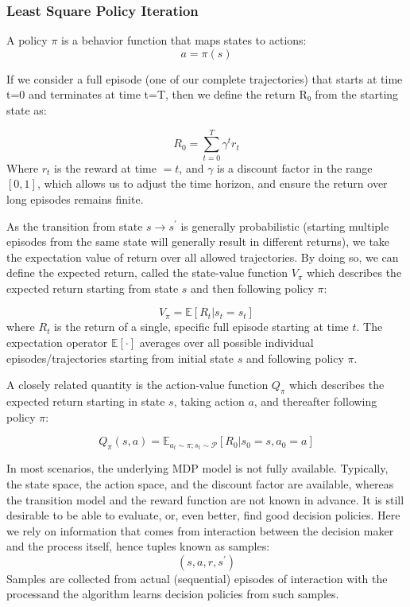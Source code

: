 \documentclass[9pt]{beamer} %
\begin{document}
\begin{frame}
\frametitle{Least Square Policy Iteration}
A policy $\pi$ is a behavior function that maps states to actions:
\begin{equation}
a = \pi(s)
\end{equation}

If we consider a full episode (one of our complete trajectories) that starts at time t=0 and terminates at time t=T, then we define the return R₀ from the starting state as:

\begin{equation}
R_0 = \sum_{t=0}^T \gamma^t r_t
\end{equation}
Where $r_t$ is the reward at time $=t$, and $\gamma$ is a discount factor in the range $[0,1]$, which allows us to adjust the time horizon, and ensure the return over long episodes remains finite. 

As the transition from state $s \rightarrow s^{\prime}$ is generally probabilistic (starting multiple episodes from the same state will generally result in different returns), we take the expectation value of return over all allowed trajectories. By doing so, we can define the expected return, called the state-value function $V_{\pi}$ which describes the expected return starting from state $s$ and then following policy $\pi$:

\begin{equation}
V_{\pi} =  \mathbb{E}[R_t | s_t = s_t] 
\end{equation}
where $R_t$ is the return of a single, specific full episode starting at time $t$. The expectation operator $\mathbb{E}[\cdot]$ averages over all possible individual episodes/trajectories starting from initial state $s$ and following policy $\pi$. 

A closely related quantity is the action-value function $Q_{\pi}$ which describes the expected return starting in state $s$, taking action $a$, and thereafter following policy $\pi$:

\begin{equation}
Q_{\pi}(s,a) =  \mathbb{E}_{a_t \sim \pi; s_t \sim \mathcal{P}}[R_0 | s_0 = s, a_0 = a] 
\end{equation}

In most scenarios, the underlying MDP model is not fully available. Typically, the state space, the action space, and the discount factor are available, whereas the transition model and the reward function are not known in advance. It is still desirable to be able to evaluate, or, even better, find good decision policies. Here we rely on information that comes from interaction between the decision maker and the process itself, hence tuples known as samples: 
\begin{equation}
(s, a, r, s^{\prime})
\end{equation}
Samples are collected from actual (sequential) episodes of interaction with the processand the algorithm learns decision policies from such samples.

\end{frame}
\end{document}
